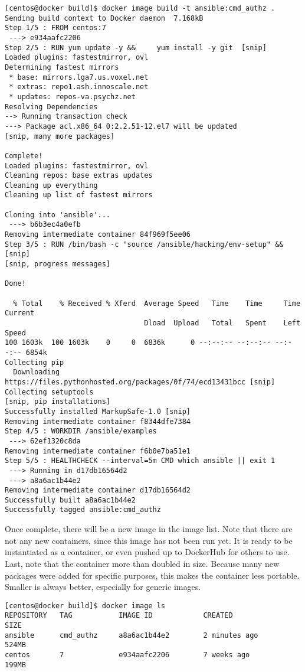 \begin{verbatim}
[centos@docker build]$ docker image build -t ansible:cmd_authz .
Sending build context to Docker daemon  7.168kB
Step 1/5 : FROM centos:7
 ---> e934aafc2206
Step 2/5 : RUN yum update -y &&     yum install -y git  [snip]
Loaded plugins: fastestmirror, ovl
Determining fastest mirrors
 * base: mirrors.lga7.us.voxel.net
 * extras: repo1.ash.innoscale.net
 * updates: repos-va.psychz.net
Resolving Dependencies
--> Running transaction check
---> Package acl.x86_64 0:2.2.51-12.el7 will be updated
[snip, many more packages]

Complete!
Loaded plugins: fastestmirror, ovl
Cleaning repos: base extras updates
Cleaning up everything
Cleaning up list of fastest mirrors

Cloning into 'ansible'...
 ---> b6b3ec4a0efb
Removing intermediate container 84f969f5ee06
Step 3/5 : RUN /bin/bash -c "source /ansible/hacking/env-setup" &&   [snip]
[snip, progress messages]

Done!

  % Total    % Received % Xferd  Average Speed   Time    Time     Time  Current
                                 Dload  Upload   Total   Spent    Left  Speed
100 1603k  100 1603k    0     0  6836k      0 --:--:-- --:--:-- --:--:-- 6854k
Collecting pip
  Downloading https://files.pythonhosted.org/packages/0f/74/ecd13431bcc [snip]
Collecting setuptools
[snip, pip installations]
Successfully installed MarkupSafe-1.0 [snip]
Removing intermediate container f8344dfe7384
Step 4/5 : WORKDIR /ansible/examples
 ---> 62ef1320c8da
Removing intermediate container f6b0e7ba51e1
Step 5/5 : HEALTHCHECK --interval=5m CMD which ansible || exit 1
 ---> Running in d17db16564d2
 ---> a8a6ac1b44e2
Removing intermediate container d17db16564d2
Successfully built a8a6ac1b44e2
Successfully tagged ansible:cmd_authz
\end{verbatim}

Once complete, there will be a new image in the image list. Note that there
are not any new containers, since this image has not been run yet. It is ready
to be instantiated as a container, or even pushed up to DockerHub for others
to use. Last, note that the container more than doubled in size. Because many
new packages were added for specific purposes, this makes the container less
portable. Smaller is always better, especially for generic images.

\begin{verbatim}
[centos@docker build]$ docker image ls
REPOSITORY   TAG           IMAGE ID            CREATED             SIZE
ansible      cmd_authz     a8a6ac1b44e2        2 minutes ago       524MB
centos       7             e934aafc2206        7 weeks ago         199MB
\end{verbatim}

